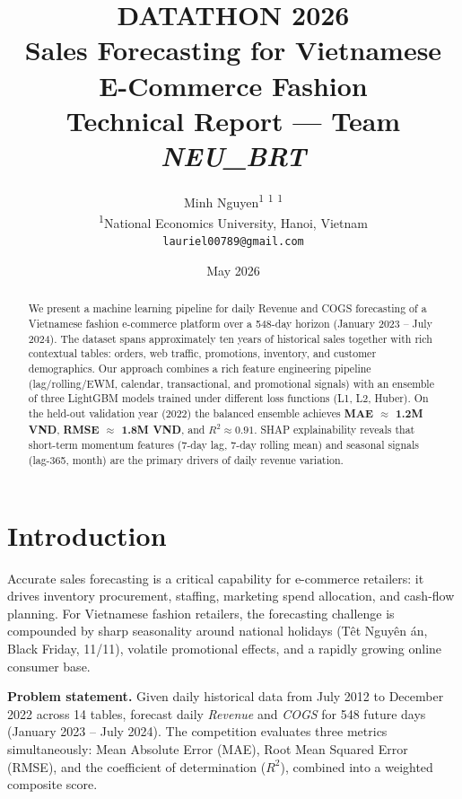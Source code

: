 \documentclass[10pt,a4paper]{article}
\title{\textbf{DATATHON 2026} \\[4pt]
       \large Sales Forecasting for Vietnamese E-Commerce Fashion \\[2pt]
       \normalsize Technical Report — Team \textit{NEU\_BRT}}
\author{
  Minh Nguyen\textsuperscript{1} \quad
  [Team Member 2]\textsuperscript{1} \quad
  [Team Member 3]\textsuperscript{1} \\[4pt]
  \textsuperscript{1}National Economics University, Hanoi, Vietnam \\
  \texttt{lauriel00789@gmail.com}
}
\date{May 2026}
\begin{document}
\maketitle

\begin{abstract}
We present a machine learning pipeline for daily Revenue and COGS forecasting
of a Vietnamese fashion e-commerce platform over a 548-day horizon
(January 2023 -- July 2024).
The dataset spans approximately ten years of historical sales together with
rich contextual tables: orders, web traffic, promotions, inventory, and customer
demographics.
Our approach combines a rich feature engineering pipeline (lag/rolling/EWM,
calendar, transactional, and promotional signals) with an ensemble of three
LightGBM models trained under different loss functions (L1, L2, Huber).
On the held-out validation year (2022) the balanced ensemble achieves
\textbf{MAE $\approx$ 1.2M VND}, \textbf{RMSE $\approx$ 1.8M VND}, and
\textbf{$R^2 \approx 0.91$}.
SHAP explainability reveals that short-term momentum features (7-day lag,
7-day rolling mean) and seasonal signals (lag-365, month) are the primary
drivers of daily revenue variation.
\end{abstract}

\section{Introduction}
\label{sec:intro}

Accurate sales forecasting is a critical capability for e-commerce retailers:
it drives inventory procurement, staffing, marketing spend allocation, and
cash-flow planning.
For Vietnamese fashion retailers, the forecasting challenge is compounded by
sharp seasonality around national holidays (T\^{e}t Nguy\^{e}n \dj{}\'{a}n,
Black Friday, 11/11), volatile promotional effects, and a rapidly growing
online consumer base.

\textbf{Problem statement.}
Given daily historical data from July 2012 to December 2022 across 14 tables,
forecast daily \textit{Revenue} and \textit{COGS} for 548 future days
(January 2023 -- July 2024).
The competition evaluates three metrics simultaneously:
Mean Absolute Error (MAE), Root Mean Squared Error (RMSE), and
the coefficient of determination ($R^2$), combined into a weighted composite
score.
\end{document}
